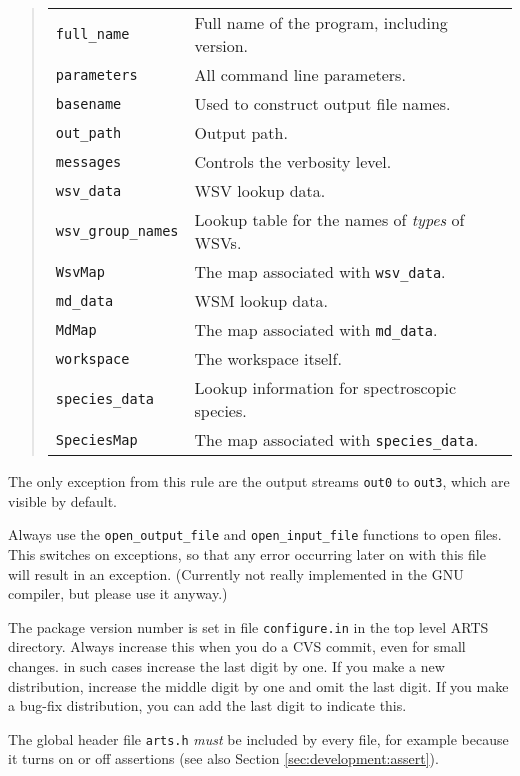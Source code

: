    \begin{quote}
   \begin{tabular}{ll}
   \verb|full_name|&         Full name of the program, including version.\\
   \verb|parameters|&        All command line parameters.\\
   \verb|basename|&          Used to construct output file names.\\
   \verb|out_path|&          Output path.\\
   \verb|messages|&          Controls the verbosity level.\\
   \verb|wsv_data|&          WSV lookup data.\\
   \verb|wsv_group_names|&   Lookup table for the names of \emph{types} of WSVs.\\
   \verb|WsvMap|&            The map associated with \verb|wsv_data|. \\
   \verb|md_data|&           WSM lookup data.\\
   \verb|MdMap|&             The map associated with \verb|md_data|. \\
   \verb|workspace|&         The workspace itself.\\
   \verb|species_data|&      Lookup information for spectroscopic species.\\
   \verb|SpeciesMap|&        The map associated with \verb|species_data|.
   \end{tabular}
   \end{quote}
   The only exception from this rule are the output streams \verb|out0| to
   \verb|out3|, which are visible by default.

Always use the \verb|open_output_file| and \verb|open_input_file|
functions to open files. This switches on exceptions, so that any
error occurring later on with this file will result in an
exception. (Currently not really implemented in the GNU compiler,
but please use it anyway.)

The package version number is set in file \verb|configure.in| in the
top level ARTS directory. Always increase this when you do a CVS
commit, even for small changes. in such cases increase the last digit
by one. If you make a new distribution, increase the middle digit by
one and omit the last digit. If you make a bug-fix distribution, you
can add the last digit to indicate this. 

The global header file \verb|arts.h| \emph{must} be included by every
file, for example because it turns on or off assertions (see also
Section \ref{sec:development:assert}).

